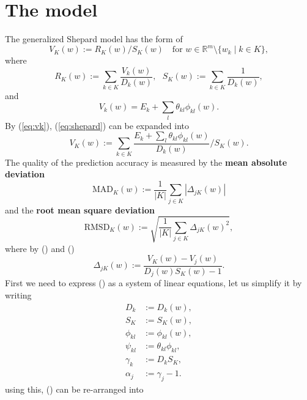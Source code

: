 \documentclass[12pt]{article}
\def\D{\displaystyle}
\begin{document}
\section{The model}
\label{sec:model}
The generalized Shepard model has the form of 
\begin{equation}
	\label{eq:shepard}
	V_K(w):=R_K(w)/S_K(w) ~~~ \text{ for } w \in \mathbb{R}^m \setminus \{w_k\mid k\in K \},
\end{equation}
where
\begin{equation}
	R_K(w):=\sum_{k\in K} \frac{V_k(w)}{D_k(w)},~~~
	S_K(w):=\sum_{k\in K} \frac{1}{D_k(w)},
\end{equation}
and
\begin{equation}
	\label{eq:vk}
	V_k(w) = E_k + \sum_l \theta_{kl} \phi_{kl}(w).
\end{equation}
By (\ref{eq:vk}), (\ref{eq:shepard}) can be expanded into
\begin{equation}
	\label{eq:vk_expand}
	V_K(w) := \sum_{k\in K} \frac{E_k + \sum_l \theta_{kl} \phi_{kl}(w)}{D_k(w)} / S_K(w). 
\end{equation}
The quality of the prediction accuracy is measured by the \textbf{mean absolute deviation}
\begin{equation}
	\text{MAD}_K(w) := \frac{1}{|K|}\sum_{j\in K}|\Delta_{jK}(w)|
\end{equation}
and the \textbf{root mean square deviation}
\begin{equation}
	\text{RMSD}_K(w) := \sqrt{\frac{1}{|K|}\sum_{j\in K}\Delta_{jK}(w)^2},
\end{equation}
where by () and ()
\begin{equation}
	\label{eq:delta}
	\Delta_{jK}(w):=\D\frac{V_K(w)-V_j(w)}{D_j(w)S_K(w)-1}.
\end{equation}
First we need to express () as a system of linear equations, let us simplify it by writing
\begin{equation*}
	\label{eq:simp}
	\begin{split}
		D_k &:= D_k(w), \\
		S_K &:= S_K(w), \\
		\phi_{kl} &:= \phi_{kl}(w),\\
		\psi_{kl} &:= \theta_{kl}\phi_{kl}, \\
		\gamma_k &:= D_kS_K, \\
		\alpha_j &:= \gamma_j-1.
	\end{split}
\end{equation*}
using this, () can be re-arranged into
\end{document}
